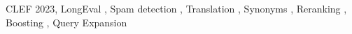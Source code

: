 \documentclass{ceurart}
\begin{document}
\begin{keywords}
  CLEF 2023\sep
  LongEval \sep
  Spam detection \sep
  Translation \sep
  Synonyms \sep
  Reranking \sep
  Boosting \sep
  Query Expansion
\end{keywords}

\maketitle











\end{document}
